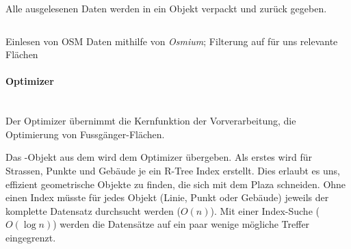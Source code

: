 Alle ausgelesenen Daten werden in ein  Objekt verpackt und zurück gegeben.

\begin{listing}[ht]
    \inputminted{python}{projectdoc/listing/osmium_handler.py}
    \caption[Einlesen OSM-Daten mit Osmium]{Einlesen von OSM Daten mithilfe von \emph{Osmium}; Filterung auf für uns relevante Flächen}
    \label{osmium_import_code}
\end{listing}

\paragraph{Optimizer}\label{impl:Optimizer}~\\
Der Optimizer übernimmt die Kernfunktion der Vorverarbeitung, die Optimierung von Fussgänger-Flächen.

Das -Objekt aus dem  wird dem Optimizer übergeben. Als erstes wird für Strassen, Punkte und Gebäude je ein R-Tree \cite{rtree_Guttman} Index erstellt. Dies erlaubt es uns, effizient geometrische Objekte zu finden, die sich mit dem \gls{Plaza} schneiden. Ohne einen Index müsste für jedes Objekt (Linie, Punkt oder Gebäude) jeweils der komplette Datensatz durchsucht werden ($O(n)$). Mit einer Index-Suche ($O(\log n)$) werden die Datensätze auf ein paar wenige mögliche Treffer eingegrenzt.

